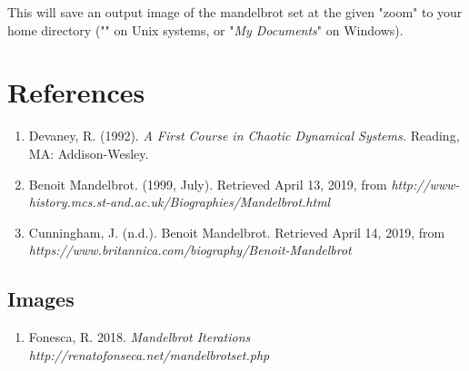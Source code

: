 \documentclass[20pt]{article} %
\begin{document}
This will save an output image of the mandelbrot set at the given "zoom" to your home directory ("" on Unix systems, or "\textit{My Documents}" on Windows).

\section{References}
\begin{enumerate}
\item Devaney, R. (1992). \textit{A First Course in Chaotic Dynamical Systems.} Reading, MA: Addison-Wesley.
\item Benoit Mandelbrot. (1999, July). Retrieved April 13, 2019, from \textit{http://www-history.mcs.st-and.ac.uk/Biographies/Mandelbrot.html}
\item Cunningham, J. (n.d.). Benoit Mandelbrot. Retrieved April 14, 2019, from\\ \textit{https://www.britannica.com/biography/Benoit-Mandelbrot}
\end{enumerate}
\subsection{Images}
\begin{enumerate}
\item Fonesca, R. 2018. \textit{Mandelbrot Iterations http://renatofonseca.net/mandelbrotset.php}
\end{enumerate}
\end{document}
